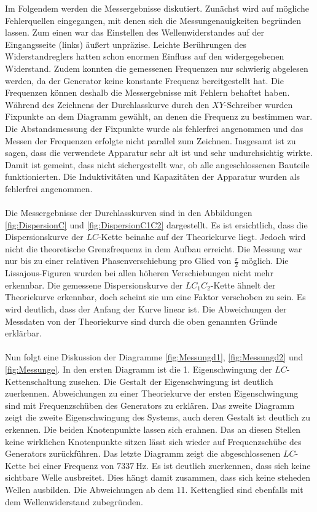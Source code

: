 Im Folgendem werden die Messergebnisse diskutiert.
Zunächst wird auf mögliche Fehlerquellen eingegangen, mit denen sich die Messungenauigkeiten
begründen lassen. Zum einen war das Einstellen des Wellenwiderstandes auf der
Eingangsseite (links) äußert unpräzise. Leichte Berührungen des Widerstandreglers
hatten schon enormen Einfluss auf den widergegebenen Widerstand.
Zudem konnten die gemessenen Frequenzen nur schwierig abgelesen werden, da der
Generator keine konstante Frequenz bereitgestellt hat. Die Frequenzen
können deshalb die Messergebnisse mit Fehlern behaftet haben.
Während des Zeichnens der Durchlasskurve durch den $XY$-Schreiber wurden Fixpunkte
an dem Diagramm gewählt, an denen die Frequenz zu bestimmen war. Die Abstandsmessung
der Fixpunkte wurde als fehlerfrei angenommen und das Messen der Frequenzen
erfolgte nicht parallel zum Zeichnen.
Insgesamt ist zu sagen, dass die verwendete Apparatur sehr alt ist und sehr
undurchsichtig wirkte.  Damit ist gemeint, dass nicht sichergestellt
war, ob alle angeschlossenen Bauteile funktionierten.
Die Induktivitäten und Kapazitäten der Apparatur wurden als fehlerfrei angenommen.\\
\\
Die Messergebnisse der Durchlasskurven sind in den Abbildungen \ref{fig:DispersionC}
und \ref{fig:DispersionC1C2} dargestellt. Es ist ersichtlich, dass
die Dispersionskurve der $LC$-Kette beinahe auf der Theoriekurve liegt.
Jedoch wird nicht die theoretische Grenzfrequenz in dem Aufbau erreicht.
Die Messung war nur bis zu einer relativen Phasenverschiebung pro Glied von
$\frac{\pi}{2}$ möglich. Die Lissajous-Figuren wurden bei allen höheren
Verschiebungen nicht mehr erkennbar. Die gemessene Dispersionskurve der
$LC_1C_2$-Kette ähnelt der Theoriekurve erkennbar, doch scheint sie um eine
Faktor verschoben zu sein. Es wird deutlich, dass der Anfang
der Kurve linear ist. Die Abweichungen der Messdaten von der Theoriekurve
sind durch die oben genannten Gründe erklärbar.\\ \\
Nun folgt eine Diskussion der Diagramme \ref{fig:Messungd1}, \ref{fig:Messungd2}
und \ref{fig:Messunge}. In den ersten Diagramm ist die 1. Eigenschwingung der
$LC$-Kettenschaltung zusehen. Die Gestalt der Eigenschwingung ist deutlich
zuerkennen. Abweichungen zu einer Theoriekurve der ersten Eigenschwingung
sind mit Frequenzschüben des Generators zu erklären.
Das zweite Diagramm zeigt die zweite Eigenschwingung des Systems, auch deren
Gestalt ist deutlich zu erkennen. Die beiden Knotenpunkte lassen sich erahnen.
Das an diesen Stellen keine wirklichen Knotenpunkte sitzen lässt sich wieder auf
Frequenzschübe des Generators zurückführen.
Das letzte Diagramm zeigt die abgeschlossenen $LC$-Kette bei einer Frequenz
von $\SI{7337}{\hertz}$. Es ist deutlich zuerkennen, dass sich keine sichtbare
Welle ausbreitet. Dies hängt damit zusammen, dass sich keine steheden Wellen
ausbilden. Die Abweichungen ab dem 11.
Kettenglied sind ebenfalls mit dem Wellenwiderstand zubegründen.

%

